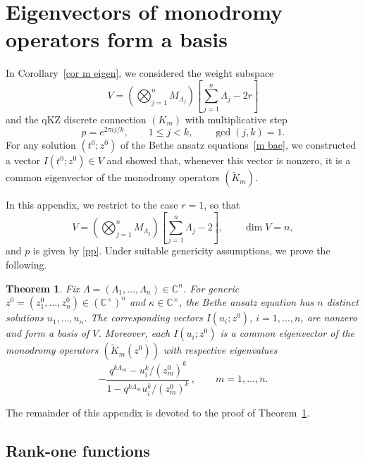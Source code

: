\documentclass[12pt]{amsart}
\newtheorem{thm}{Theorem}[section]
\theoremstyle{definition} %
\numberwithin{equation}{section}
\theoremstyle{definition}
\let\ka\kappa
\let\La\Lambda
\let\leq\leqslant
\def\C{{\mathbb C}}
\begin{document}
\section{Eigenvectors of monodromy operators form a basis}
\label{appB}

In Corollary~\ref{cor m eigen}, we considered the weight subspace
\[
V
=
\left(\bigotimes_{j=1}^n M_{\La_j}\right)
\!\left[\sum_{j=1}^n\La_j-2r\right]
\]
and the qKZ discrete connection $(K_m)$ with multiplicative step
\begin{equation}
\label{pp}
p=e^{2\pi i j/k},
\qquad
1\leq j<k,
\qquad
\gcd(j,k)=1.
\end{equation}
For any solution $(t^0;z^0)$ of the Bethe ansatz equations~\eqref{m bae},
we constructed a vector $I(t^0;z^0)\in V$ and showed that, whenever
this vector is nonzero, it is a common eigenvector of the monodromy
operators $(\widetilde K_m)$.

In this appendix, we restrict to the case $r=1$, so that
\[
V
=
\left(\bigotimes_{j=1}^n M_{\La_j}\right)
\!\left[\sum_{j=1}^n\La_j-2\right],
\qquad
\dim V=n,
\]
and $p$ is given by \eqref{pp}.
Under suitable genericity assumptions, we prove the following.

\begin{thm}
\label{thm:basis}
Fix $\La=(\La_1,\dots,\La_n)\in\C^n$.
For generic $z^0=(z_1^0,\dots,z_n^0)\in(\C^\times)^n$ and
$\ka\in\C^\times$, the Bethe ansatz equation has $n$
distinct solutions $u_1,\dots,u_n$. The corresponding vectors
$I(u_i;z^0)$, $i=1,\dots,n$, are nonzero and form a basis of $V$.
Moreover, each $I(u_i;z^0)$ is a common eigenvector of the monodromy
operators $(\widetilde K_m(z^0))$ with respective eigenvalues
\[
- \frac{q^{k\La_m}-u_i^k/(z_m^0)^k}
     {1-q^{k\La_m}u_i^k/(z_m^0)^k}\,,
\qquad m=1,\dots,n.
\]
\end{thm}

The remainder of this appendix is devoted to the proof of
Theorem~\ref{thm:basis}.

\subsection{Rank-one functions}
\end{document}
